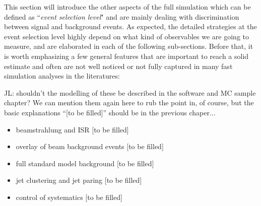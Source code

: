 This section will introduce the other aspects of the full simulation which can be
defined as ``{\it event selection level}" and are mainly dealing with discrimination 
between signal and background events. As expected, the detailed strategies 
at the event selection level highly depend on what kind of observables we are going to
measure, and are elaborated in each of the following sub-sections. Before that, it is worth
emphasizing a few general features that are important to reach a solid estimate
and often are not well noticed or not fully captured in 
many fast simulation analyses in the literatures:

{\color{red} JL: shouldn't the modelling of these be described in the software and MC sample chapter? We can mention them again here to rub the point in, of course, but the basic explanations ``[to be filled]'' should be in the previous chaper...}

\begin{itemize}
\item beamstrahlung and ISR
[to be filled]
\item overlay of beam background events
[to be filled]
\item full standard model background
[to be filled]
\item jet clustering and jet paring
[to be filled]
\item control of systematics 
[to be filled]
\end{itemize}

